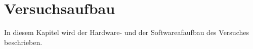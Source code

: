 \chapter{Versuchsaufbau}

In diesem Kapitel wird der Hardware- und der Softwareafaufbau des Versuches beschrieben.

